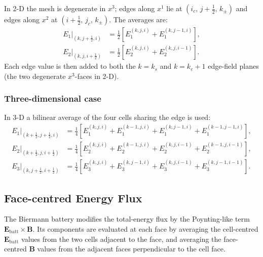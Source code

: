 \documentclass[11pt]{article}
\newcommand{\bv}[1]{\boldsymbol{#1}}
\newcommand{\Ebatt}{\bv{E}_\mathrm{batt}}
\newcommand{\half}{\tfrac{1}{2}}
\begin{document}
In 2-D the mesh is degenerate in $x^3$; edges along $x^1$ lie at
$(i_c,\,j+\half,\,k_\pm)$ and edges along $x^2$ at
$(i+\half,\,j_c,\,k_\pm)$.  The averages are:
\begin{align}
  E_1\big|_{(k,j+\frac{1}{2},i)}
    &= \half\!\left[E_1^{(k,j,i)} + E_1^{(k,j-1,i)}\right],
  \label{eq:e1_2d}
  \\[4pt]
  E_2\big|_{(k,j,i+\frac{1}{2})}
    &= \half\!\left[E_2^{(k,j,i)} + E_2^{(k,j,i-1)}\right].
  \label{eq:e2_2d}
\end{align}
Each edge value is then added to both the $k=k_s$ and $k=k_e+1$
edge-field planes (the two degenerate $x^3$-faces in 2-D).

\subsubsection{Three-dimensional case}

In 3-D a bilinear average of the four cells sharing the edge is used:
\begin{align}
  E_1\big|_{(k+\frac{1}{2},j+\frac{1}{2},i)}
    &= \tfrac{1}{4}\!\left[
       E_1^{(k,j,i)} + E_1^{(k-1,j,i)}
     + E_1^{(k,j-1,i)} + E_1^{(k-1,j-1,i)}\right],
  \label{eq:e1_3d}
  \\[4pt]
  E_2\big|_{(k+\frac{1}{2},j,i+\frac{1}{2})}
    &= \tfrac{1}{4}\!\left[
       E_2^{(k,j,i)} + E_2^{(k-1,j,i)}
     + E_2^{(k,j,i-1)} + E_2^{(k-1,j,i-1)}\right],
  \label{eq:e2_3d}
  \\[4pt]
  E_3\big|_{(k,j+\frac{1}{2},i+\frac{1}{2})}
    &= \tfrac{1}{4}\!\left[
       E_3^{(k,j,i)} + E_3^{(k,j-1,i)}
     + E_3^{(k,j,i-1)} + E_3^{(k,j-1,i-1)}\right].
  \label{eq:e3_3d}
\end{align}

\subsection{Face-centred Energy Flux}
\label{sec:energy_flux}

The Biermann battery modifies the total-energy flux by the Poynting-like term
$\Ebatt\times\bv{B}$.  Its components are evaluated at each face by
averaging the cell-centred $\Ebatt$ values from the two cells adjacent to the
face, and averaging the face-centred $\bv{B}$ values from the adjacent faces
perpendicular to the cell face.
\end{document}
